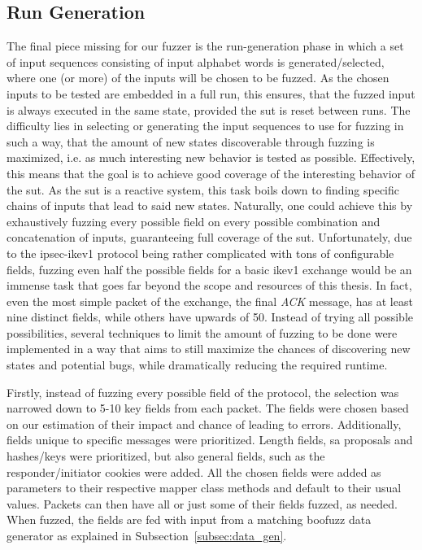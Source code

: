 \subsection{Run Generation} \label{subsec:run_generation}
The final piece missing for our fuzzer is the run-generation phase in which a set of input sequences consisting of input alphabet words is generated/selected, where one (or more) of the inputs will be chosen to be fuzzed. As the chosen inputs to be tested are embedded in a full run, this ensures, that the fuzzed input is always executed in the same state, provided the \ac{sut} is reset between runs. The difficulty lies in selecting or generating the input sequences to use for fuzzing in such a way, that the amount of new states discoverable through fuzzing is maximized, i.e. as much interesting new behavior is tested as possible. Effectively, this means that the goal is to achieve good coverage of the interesting behavior of the \ac{sut}. As the \ac{sut} is a reactive system, this task boils down to finding specific chains of inputs that lead to said new states. Naturally, one could achieve this by exhaustively fuzzing every possible field on every possible combination and concatenation of inputs, guaranteeing full coverage of the \ac{sut}. Unfortunately, due to the \ac{ipsec}-\ac{ike}v1 protocol being rather complicated with tons of configurable fields, fuzzing even half the possible fields for a basic \ac{ike}v1 exchange would be an immense task that goes far beyond the scope and resources of this thesis. In fact, even the most simple packet of the exchange, the final \emph{ACK} message, has at least nine distinct fields, while others have upwards of 50. Instead of trying all possible possibilities, several techniques to limit the amount of fuzzing to be done were implemented in a way that aims to still maximize the chances of discovering new states and potential bugs, while dramatically reducing the required runtime. 

Firstly, instead of fuzzing every possible field of the protocol, the selection was narrowed down to 5-10 key fields from each packet. The fields were chosen based on our estimation of their impact and chance of leading to errors. Additionally, fields unique to specific messages were prioritized. Length fields, \ac{sa} proposals and hashes/keys were prioritized, but also general fields, such as the responder/initiator cookies were added. All the chosen fields were added as parameters to their respective mapper class methods and default to their usual values. Packets can then have all or just some of their fields fuzzed, as needed. When fuzzed, the fields are fed with input from a matching boofuzz data generator as explained in Subsection~\ref{subsec:data_gen}.


